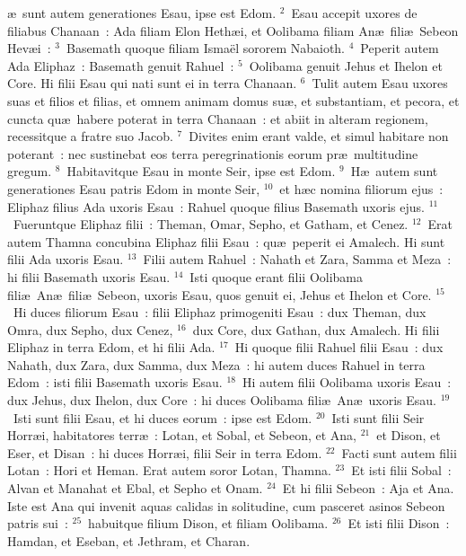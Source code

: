 \bchapter
{}\ae\ sunt autem generationes Esau, ipse est Edom.
${}^{2}$~Esau accepit uxores de filiabus Chanaan~: Ada filiam Elon Heth\ae i, et Oolibama filiam An\ae\ fili\ae\ Sebeon Hev\ae i~:
${}^{3}$~Basemath quoque filiam Isma\"el sororem Nabaioth.
${}^{4}$~Peperit autem Ada Eliphaz~: Basemath genuit Rahuel~:
${}^{5}$~Oolibama genuit Jehus et Ihelon et Core. Hi filii Esau qui nati sunt ei in terra Chanaan.
${}^{6}$~Tulit autem Esau uxores suas et filios et filias, et omnem animam domus su\ae , et substantiam, et pecora, et cuncta qu\ae\ habere poterat in terra Chanaan~: et abiit in alteram regionem, recessitque a fratre suo Jacob.
${}^{7}$~Divites enim erant valde, et simul habitare non poterant~: nec sustinebat eos terra peregrinationis eorum pr\ae\ multitudine gregum.
${}^{8}$~Habitavitque Esau in monte Seir, ipse est Edom.
${}^{9}$~H\ae\ autem sunt generationes Esau patris Edom in monte Seir,
${}^{10}$~et h\ae c nomina filiorum ejus~: Eliphaz filius Ada uxoris Esau~: Rahuel quoque filius Basemath uxoris ejus.
${}^{11}$~Fueruntque Eliphaz filii~: Theman, Omar, Sepho, et Gatham, et Cenez.
${}^{12}$~Erat autem Thamna concubina Eliphaz filii Esau~: qu\ae\ peperit ei Amalech. Hi sunt filii Ada uxoris Esau.
${}^{13}$~Filii autem Rahuel~: Nahath et Zara, Samma et Meza~: hi filii Basemath uxoris Esau.
${}^{14}$~Isti quoque erant filii Oolibama fili\ae\ An\ae\ fili\ae\ Sebeon, uxoris Esau, quos genuit ei, Jehus et Ihelon et Core.
${}^{15}$~Hi duces filiorum Esau~: filii Eliphaz primogeniti Esau~: dux Theman, dux Omra, dux Sepho, dux Cenez,
${}^{16}$~dux Core, dux Gathan, dux Amalech. Hi filii Eliphaz in terra Edom, et hi filii Ada.
${}^{17}$~Hi quoque filii Rahuel filii Esau~: dux Nahath, dux Zara, dux Samma, dux Meza~: hi autem duces Rahuel in terra Edom~: isti filii Basemath uxoris Esau.
${}^{18}$~Hi autem filii Oolibama uxoris Esau~: dux Jehus, dux Ihelon, dux Core~: hi duces Oolibama fili\ae\ An\ae\ uxoris Esau.
${}^{19}$~Isti sunt filii Esau, et hi duces eorum~: ipse est Edom.
${}^{20}$~Isti sunt filii Seir Horr\ae i, habitatores terr\ae~: Lotan, et Sobal, et Sebeon, et Ana,
${}^{21}$~et Dison, et Eser, et Disan~: hi duces Horr\ae i, filii Seir in terra Edom.
${}^{22}$~Facti sunt autem filii Lotan~: Hori et Heman. Erat autem soror Lotan, Thamna.
${}^{23}$~Et isti filii Sobal~: Alvan et Manahat et Ebal, et Sepho et Onam.
${}^{24}$~Et hi filii Sebeon~: Aja et Ana. Iste est Ana qui invenit aquas calidas in solitudine, cum pasceret asinos Sebeon patris sui~:
${}^{25}$~habuitque filium Dison, et filiam Oolibama.
${}^{26}$~Et isti filii Dison~: Hamdan, et Eseban, et Jethram, et Charan.
